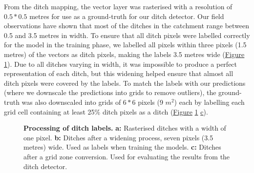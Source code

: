 \documentclass[11pt, review]{elsarticle} %
\begin{document}
From the ditch mapping, the vector layer was rasterised with a resolution of $0.5*0.5$ metres for use as a ground-truth for our ditch detector. Our field observations have shown that most of the ditches in the catchment range between 0.5 and 3.5 metres in width. To ensure that all ditch pixels were labelled correctly for the model in the training phase, we labelled all pixels within three pixels (1.5 metres) of the vectors as ditch pixels, making the labels 3.5 metres wide (\hyperref[fig:ditchpreprocess]{Figure} \ref{fig:ditchpreprocess}). Due to all ditches varying in width, it was impossible to produce a perfect representation of each ditch, but this widening helped ensure that almost all ditch pixels were covered by the labels. To match the labels with our predictions (where we downscale the predictions into grids to remove outliers), the ground-truth was also downscaled into grids of $6*6$ pixels (9 $m^2$) each by labelling each grid cell containing at least 25\% ditch pixels as a ditch (\hyperref[fig:ditchpreprocess]{Figure} \ref{fig:ditchpreprocess} \hyperref[fig:ditchpreprocess]{c}).

\begin{figure} [!htb]
    \centering
    \hspace{5pt}
    \caption{\textbf{Processing of ditch labels.} \textbf{a: }Rasterised ditches with a width of one pixel. \textbf{b: }Ditches after a widening process, seven pixels (3.5 metres) wide. Used as labels when training the models. \textbf{c: }Ditches after a grid zone conversion. Used for evaluating the results from the ditch detector.} \label{sample-figure}
    \label{fig:ditchpreprocess}
\end{figure}
\end{document}
